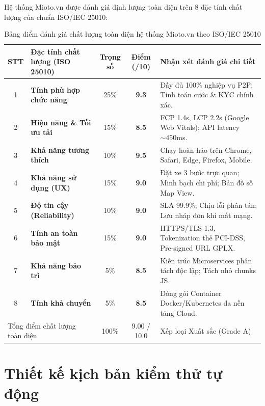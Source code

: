 \documentclass[12pt,a4paper,oneside]{report}
\begin{document}
Hệ thống Mioto.vn được đánh giá định lượng toàn diện trên 8 đặc tính chất lượng của chuẩn ISO/IEC 25010:

\begin{table}[ht]
  \centering\footnotesize
  \begin{tabularx}{\textwidth}{cp{4.2cm}ccX}
    \toprule
    \textbf{STT} & \textbf{Đặc tính chất lượng (ISO 25010)} & \textbf{Trọng số} & \textbf{Điểm (/10)} & \textbf{Nhận xét đánh giá chi tiết} \\
    \midrule
    1 & \textbf{Tính phù hợp chức năng} & 25\% & \textbf{9.3} & Đầy đủ 100\% nghiệp vụ P2P; Tính toán cước \& KYC chính xác. \\
    2 & \textbf{Hiệu năng \& Tối ưu tải} & 15\% & \textbf{8.5} & FCP 1.4s, LCP 2.2s (Google Web Vitals); API latency $\sim 450$ms. \\
    3 & \textbf{Khả năng tương thích} & 10\% & \textbf{9.5} & Chạy hoàn hảo trên Chrome, Safari, Edge, Firefox, Mobile. \\
    4 & \textbf{Khả năng sử dụng (UX)} & 15\% & \textbf{9.0} & Đặt xe 3 bước trực quan; Minh bạch chi phí; Bản đồ số Map View. \\
    5 & \textbf{Độ tin cậy (Reliability)} & 10\% & \textbf{9.0} & SLA 99.9\%; Chịu lỗi phân tán; Lưu nháp đơn khi mất mạng. \\
    6 & \textbf{Tính an toàn bảo mật} & 15\% & \textbf{9.0} & HTTPS/TLS 1.3, Tokenization thẻ PCI-DSS, Pre-signed URL GPLX. \\
    7 & \textbf{Khả năng bảo trì} & 5\% & \textbf{8.5} & Kiến trúc Microservices phân tách độc lập; Tách nhỏ chunks JS. \\
    8 & \textbf{Tính khả chuyển} & 5\% & \textbf{8.5} & Đóng gói Container Docker/Kubernetes đa nền tảng Cloud. \\
    \midrule
    \multicolumn{2}{l}{Tổng điểm chất lượng toàn diện} & 100\% & 9.00 / 10.0 & Xếp loại Xuất sắc (Grade A) \\
    \bottomrule
  \end{tabularx}
  \caption{Bảng điểm đánh giá chất lượng toàn diện hệ thống Mioto.vn theo ISO/IEC 25010}
  \label{tab:iso_quality_score}
\end{table}

\chapter{Thiết kế kịch bản kiểm thử tự động}
\end{document}
